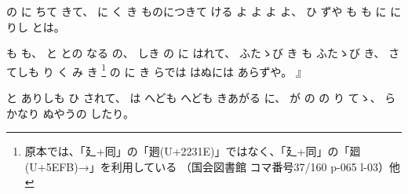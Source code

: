 %
の
に
ちて
きて、%
%
に
く
き
ものにつきて
ける%
よ
よ
よ
よ、
%
ひ
ずや
も
も
に
に
りし
とは。

%
も
も、
%
と
との
なる
の、
%
しき
の
に
はれて、
%
ふたゝび%
き
も
ふたゝび%
き、
%
さてしも
り
く
み
き
\footnote{原本では、「廴+囘」の「𢌞(U+2231E)」ではなく、「廴+同」の「廻(U+5EFB)→」を利用している
（国会図書館 コマ番号37/160 p-065 l-03）他}%
の
に
き
らでは
はぬには
あらずや。
』

%
と
ありしも
ひ
されて、
%
は
へども
へども
きあがる
に、
%
が
の%
の%
り
てゝ、%
%
らかなり
ぬやうの
したり。

